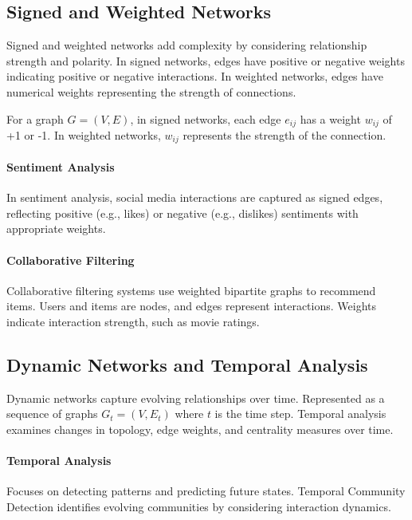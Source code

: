 \documentclass[12pt]{book} %
\begin{document}
\subsection{Signed and Weighted Networks}

Signed and weighted networks add complexity by considering relationship strength and polarity. In signed networks, edges have positive or negative weights indicating positive or negative interactions. In weighted networks, edges have numerical weights representing the strength of connections.

For a graph \(G = (V, E)\), in signed networks, each edge \(e_{ij}\) has a weight \(w_{ij}\) of +1 or -1. In weighted networks, \(w_{ij}\) represents the strength of the connection.

\paragraph{Sentiment Analysis}

In sentiment analysis, social media interactions are captured as signed edges, reflecting positive (e.g., likes) or negative (e.g., dislikes) sentiments with appropriate weights.

\paragraph{Collaborative Filtering}

Collaborative filtering systems use weighted bipartite graphs to recommend items. Users and items are nodes, and edges represent interactions. Weights indicate interaction strength, such as movie ratings.

\subsection{Dynamic Networks and Temporal Analysis}

Dynamic networks capture evolving relationships over time. Represented as a sequence of graphs \(G_t = (V, E_t)\) where \(t\) is the time step. Temporal analysis examines changes in topology, edge weights, and centrality measures over time.

\paragraph{Temporal Analysis}

Focuses on detecting patterns and predicting future states. Temporal Community Detection identifies evolving communities by considering interaction dynamics.
\end{document}

